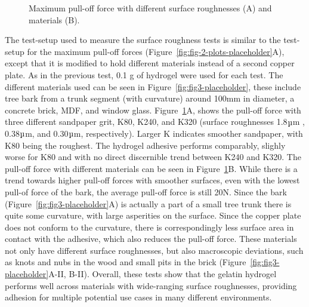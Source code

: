 \begin{figure}
\centering
{}
  \caption{Maximum pull-off force with different surface roughnesses (A) and materials (B).}
  \label{fig:fig-plot-surfaces}

\end{figure}

The test-setup used to measure the surface roughness tests is similar to the test-setup for the maximum pull-off forces (Figure~\ref{fig:fig-2-plots-placeholder}A), except that it is modified to hold different materials instead of a second copper plate. As in the previous test, 0.1 g of hydrogel were used for each test. The different materials used can be seen in Figure~\ref{fig:fig3-placeholder}, these include tree bark from a trunk segment (with curvature) around 100mm in diameter, a concrete brick, MDF, and window glass. Figure~\ref{fig:fig-plot-surfaces}A, shows the pull-off force with three different sandpaper grit, K80, K240, and K320 (surface roughnesses 1.8$\micro$m , 0.38$\micro$m, and 0.30$\micro$m, respectively). Larger K indicates smoother sandpaper, with K80 being the roughest. The hydrogel adhesive performs comparably, slighly worse for K80 and with no direct discernible trend between K240 and K320. The pull-off force with different materials can be seen in Figure~\ref{fig:fig-plot-surfaces}B. While there is a trend towards higher pull-off forces with smoother surfaces, even with the lowest pull-of force of the bark, the average pull-off force is still 20N. Since the bark (Figure~\ref{fig:fig3-placeholder}A) is actually a part of a small tree trunk there is quite some curvature, with large asperities on the surface. Since the copper plate does not conform to the curvature, there is correspondingly less surface area in contact with the adhesive, which also reduces the pull-off force. These materials not only have different surface roughnesses, but also macroscopic deviations, such as knots and nubs in the wood and small pits in the brick (Figure~\ref{fig:fig3-placeholder}A-II, B-II). Overall, these tests show that the gelatin hydrogel performs well across materials with wide-ranging surface roughnesses, providing adhesion for multiple potential use cases in many different environments. 


